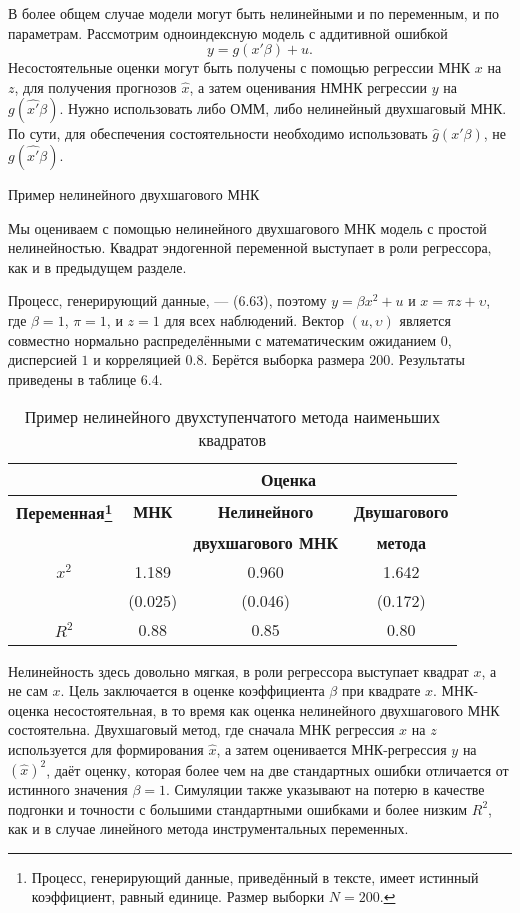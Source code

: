 В более общем случае модели могут быть нелинейными и по переменным, и по параметрам. Рассмотрим одноиндексную модель с аддитивной ошибкой
\[
y=g(x'\beta)+u.
\]
Несостоятельные оценки могут быть получены с помощью регрессии МНК $x$ на $z$, для получения прогнозов $\hat{x}$, а затем оценивания НМНК регрессии $y$ на $g(\hat{x'}\beta)$. Нужно использовать либо ОММ, либо нелинейный двухшаговый МНК. По сути, для обеспечения состоятельности необходимо использовать $\hat{g}(x'\beta)$, не $g(\hat{x'}\beta)$.

\begin{center}
Пример нелинейного двухшагового МНК
\end{center}

Мы оцениваем с помощью нелинейного двухшагового МНК модель с простой нелинейностью. Квадрат эндогенной переменной выступает в роли регрессора, как и в предыдущем разделе.

Процесс, генерирующий данные, --- (6.63), поэтому $y=\beta x^2 + u$ и $x=\pi z + \upsilon$, где $\beta=1$, $\pi=1$, и $z=1$ для всех наблюдений. Вектор $(u,\upsilon)$ является совместно нормально распределёнными с математическим ожиданием $0$, дисперсией $1$ и корреляцией $0.8$. Берётся выборка размера 200. Результаты приведены в таблице 6.4.

\begin{table}[h]
\begin{center}
\caption{\label{tab:GMMestnl} Пример нелинейного двухступенчатого метода наименьших квадратов}
\begin{minipage}{12.5cm}
\begin{tabular}[t]{cccc}
\hline
\hline
& \multicolumn{3}{c}{\bf{Оценка}} \\
\hline
\bf{Переменная}\footnote{Процесс, генерирующий данные, приведённый в тексте, имеет истинный коэффициент, равный единице. Размер выборки $N=200$.} & \bf{МНК} & \bf{Нелинейного} & \bf{Двушагового} \\
 & & \bf{двухшагового МНК} & \bf{метода} \\
\hline
$x^2$ & 1.189 & 0.960 & 1.642 \\
 & (0.025) & (0.046) & (0.172) \\
$R^2$ & 0.88 & 0.85 & 0.80 \\
\hline
\hline
\end{tabular}
\end{minipage}
\end{center}
\end{table}

Нелинейность здесь довольно мягкая, в роли регрессора выступает квадрат $x$, а не сам $x$. Цель заключается в оценке коэффициента $\beta$ при квадрате $x$. МНК-оценка несостоятельная, в то время как оценка нелинейного двухшагового МНК состоятельна. Двухшаговый метод, где сначала МНК регрессия $x$ на $z$ используется для формирования $\hat{x}$, а затем оценивается МНК-регрессия $y$ на $(\hat{x})^2$, даёт оценку, которая более чем на две стандартных ошибки отличается от истинного значения $\beta=1$. Симуляции также указывают на потерю в качестве подгонки и точности с большими стандартными ошибками и более низким $R^2$, как и в случае линейного метода инструментальных переменных.

